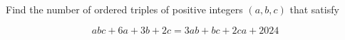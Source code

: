 Find the number of ordered triples of positive integers $(a,b,c)$ that satisfy

$$abc+6a+3b+2c=3ab+bc+2ca+2024$$
